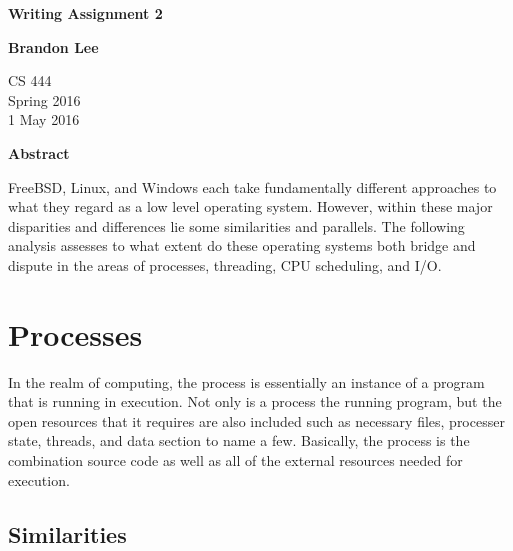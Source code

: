 \documentclass[letterpaper,10pt,titlepage]{article}
\begin{document}
\begin{titlepage}
    \begin{center}
        \vspace*{3.5cm}

        \textbf{Writing Assignment 2}

        \vspace{0.5cm}

        \textbf{Brandon Lee}

        \vspace{0.8cm}

        CS 444\\
        Spring 2016\\
        1 May 2016\\

        \vspace{1cm}

        \textbf{Abstract}\\

        \vspace{0.5cm}

        FreeBSD, Linux, and Windows each take fundamentally different approaches to what they regard as a low level operating system.  However, within these major disparities and differences lie some similarities and parallels.  The following analysis assesses to what extent do these operating systems both bridge and dispute in the areas of processes, threading, CPU scheduling, and I/O.

        \vfill

    \end{center}
\end{titlepage}

\newpage

\tableofcontents

\newpage

\section{Processes}

In the realm of computing, the process is essentially an instance of a program that is running in execution.  Not only is a process the running program, but the open resources that it requires are also included such as necessary files, processer state, threads, and data section to name a few.  Basically, the process is the combination source code as well as all of the external resources needed for execution.


\subsection{Similarities}
\end{document}
